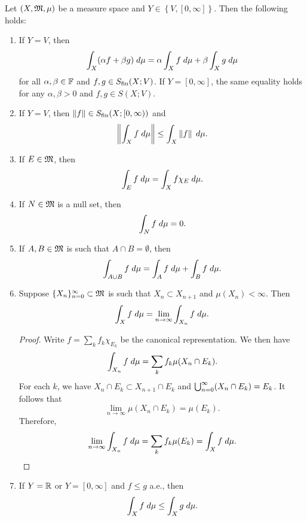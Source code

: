 \documentclass[a4paper]{article}
\begin{document}
\begin{prop}
  Let $(X, \mathfrak{M}, \mu)$ be a measure space and
  $Y \in \left\{ V, [0, \infty] \right\}$.
  Then the following holds:
  \begin{enumerate}
    \item If $Y = V$, then
    \[
      \int_X (\alpha f + \beta g) \; d \mu
      = \alpha \int_X f \; d \mu + \beta \int_X
      g \; d \mu
    \]
    for all $\alpha, \beta \in \mathbb{F}$ and
    $f, g \in S_{\text{fin}}(X ; V)$.
    If $Y = [0, \infty]$, the same equality holds
    for any $\alpha, \beta > 0$ and $f, g \in S(X; V)$.

    \item If $Y = V$, then
    $\left\lVert f\right\rVert \in S_{\text{fin}}(X; [0, \infty))$
    and
    \[
      \left\lVert \int_X f \; d\mu\right\rVert \leq \int_X \left\lVert f\right\rVert \; d\mu.
    \]

    \item If $E \in \mathfrak{M}$, then
    \[
      \int_E f \; d \mu = \int_X f \chi_E \; d \mu.
    \]

    \item If $N \in \mathfrak{M}$ is a null set, then
    \[
      \int_N f \; d \mu = 0.
    \]

    \item If $A, B \in \mathfrak{M}$ is such that
    $A \cap B = \emptyset$,
    then
    \[
    \int_{A \cup B} f \; d\mu = \int_A f \; d\mu
    + \int_B f \; d\mu.
    \]

    \item Suppose $\{ X_n \}_{n=0}^\infty \subset \mathfrak{M}$ is such that
    $X_n \subset X_{n+1}$ and $\mu(X_n) < \infty$.
    Then
    \[
      \int_X f \; d \mu = \lim_{n \to \infty}
      \int_{X_n} f \; d\mu.
    \]

    \begin{proof}
      Write $f = \sum_k f_k \chi_{E_k}$ be the canonical
      representation. We then have
      \[
      \int_{X_n} f \; d\mu = \sum_k f_k \mu(X_n \cap E_k).
      \]
      For each $k$, we have
      $X_n \cap E_k \subset X_{n+1} \cap E_k$ and
      $\bigcup_{n=0}^\infty (X_n \cap E_k) = E_k$.
      It follows that
      \[
        \lim_{n \to \infty} \mu(X_n \cap E_k)
        = \mu(E_k).
      \]
      Therefore,
      \[
      \lim_{n \to \infty} \int_{X_n} f \; d\mu
      = \sum_k f_k \mu(E_k) = \int_X f \; d\mu.
      \]

    \end{proof}

    \item If $Y = \mathbb{R}$ or $Y = [0, \infty]$ and
    $f \leq g$ a.e., then
    \[
    \int_X f \; d\mu \leq \int_X g \; d\mu.
    \]
  \end{enumerate}
\end{prop}
\end{document}
